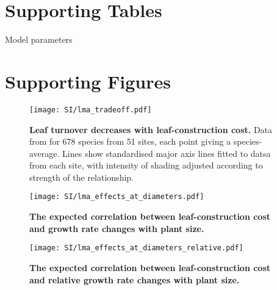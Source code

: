 \documentclass[10pt,twoside]{article}\usepackage[]{graphicx}\usepackage[]{color}
\date{}
\begin{document}
\maketitle

\tableofcontents

\renewcommand{\thefigure}{S\arabic{figure}}
\renewcommand{\thetable}{S\arabic{table}}
\setcounter{secnumdepth}{0}

\clearpage

\section{Supporting Tables}\label{app:supp_info_table}



\begin{table}[ht]
\caption{Model parameters}
\centering
{\footnotesize  %
\begin{doublespace}
% 

\end{doublespace}
}
\label{tab:params}
\end{table}

\newpage

\section{Supporting Figures}\label{app:supp_info_figures}

\begin{figure}[ht]
\centering
\texttt{[image: SI/lma\_tradeoff.pdf]}
\caption{\textbf{Leaf turnover decreases with leaf-construction cost.}
Data from \citep{Wright-2004} for 678 species from 51 sites, each
point giving a species-average. Lines show standardised major axis lines
fitted to datsa from each site, with intensity of shading adjusted
according to strength of the relationship.\label{fS-leaf}}
\end{figure}

\newpage

\begin{figure}[ht]
\centering
\texttt{[image: SI/lma\_effects\_at\_diameters.pdf]}
\caption{\textbf{The expected correlation between leaf-construction cost
and growth rate changes with plant size.} \label{f-lma_growth_size}}
\end{figure}

\begin{figure}[ht]
\centering
\texttt{[image: SI/lma\_effects\_at\_diameters\_relative.pdf]}
\caption{\textbf{The expected correlation between leaf-construction cost
and relative growth rate changes with plant size.}
\label{f-lma_growth_size_relative}}
\end{figure}
\end{document}
